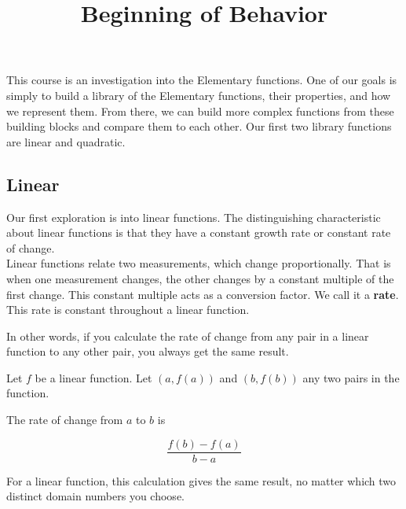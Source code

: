 \documentclass{ximera}
\title{Beginning of Behavior}
\begin{document}
\begin{abstract}
\end{abstract}
\maketitle





This course is an investigation into the Elementary functions.  One of our goals is simply to build a library of the Elementary functions, their properties, and how we represent them.  From there, we can build more complex functions from these building blocks and compare them to each other. Our first two library functions are linear and quadratic. \\



\subsection*{Linear}

Our first exploration is into linear functions. The distinguishing characteristic about linear functions is that they have a constant growth rate or constant rate of change.  \\




Linear functions relate two measurements, which change proportionally.  That is when one measurement changes, the other changes by a constant multiple of the first change.  This constant multiple acts as a conversion factor.  We call it a \textbf{\textcolor{purple!85!blue}{rate}}. \\



This rate is constant throughout a linear function.





In other words, if you calculate the rate of change from any pair in a linear function to any other pair, you always get the same result.

Let $f$ be a linear function.  Let $(a, f(a))$ and $(b, f(b))$ any two pairs in the function.

The rate of change from $a$ to $b$ is 

\[
\frac{f(b) - f(a)}{b-a}
\]


For a linear function, this calculation gives the same result, no matter which two distinct domain numbers you choose.
\end{document}
